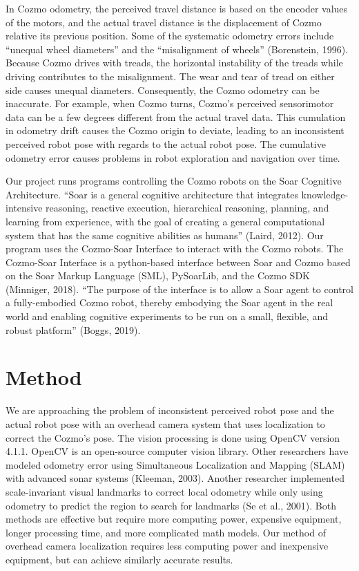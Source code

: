 \documentclass[jou,apacite]{apa6}
\begin{document}
In Cozmo odometry, the perceived travel distance is based on the encoder values of the motors, and the actual travel distance is the displacement of Cozmo relative its previous position. Some of the systematic odometry errors include “unequal wheel diameters” and the “misalignment of wheels” (Borenstein, 1996). Because Cozmo drives with treads, the horizontal instability of the treads while driving contributes to the misalignment. The wear and tear of tread on either side causes unequal diameters. Consequently, the Cozmo odometry can be inaccurate. For example, when Cozmo turns, Cozmo’s perceived sensorimotor data can be a few degrees different from the actual travel data. This cumulation in odometry drift causes the Cozmo origin to deviate, leading to an inconsistent perceived robot pose with regards to the actual robot pose. The cumulative odometry error causes problems in robot exploration and navigation over time.

Our project runs programs controlling the Cozmo robots on the Soar Cognitive Architecture. “Soar is a general cognitive architecture that integrates knowledge-intensive reasoning, reactive execution, hierarchical reasoning, planning, and learning from experience, with the goal of creating a general computational system that has the same cognitive abilities as humans” (Laird, 2012). Our program uses the Cozmo-Soar Interface to interact with the Cozmo robots. The Cozmo-Soar Interface is a python-based interface between Soar and Cozmo based on the Soar Markup Language (SML), PySoarLib, and the Cozmo SDK (Minniger, 2018). “The purpose of the interface is to allow a Soar agent to control a fully-embodied Cozmo robot, thereby embodying the Soar agent in the real world and enabling cognitive experiments to be run on a small, flexible, and robust platform” (Boggs, 2019).


\section{Method}
We are approaching the problem of inconsistent perceived robot pose and the actual robot pose with an overhead camera system that uses localization to correct the Cozmo's pose. The vision processing is done using OpenCV version 4.1.1. OpenCV is an open-source computer vision library. Other researchers have modeled odometry error using Simultaneous Localization and Mapping (SLAM) with advanced sonar systems (Kleeman, 2003). Another researcher implemented scale-invariant visual landmarks to correct local odometry while only using odometry to predict the region to search for landmarks (Se et al., 2001). Both methods are effective but require more computing power, expensive equipment, longer processing time, and more complicated math models. Our method of overhead camera localization requires less computing power and inexpensive equipment, but can achieve similarly accurate results.
\end{document}

